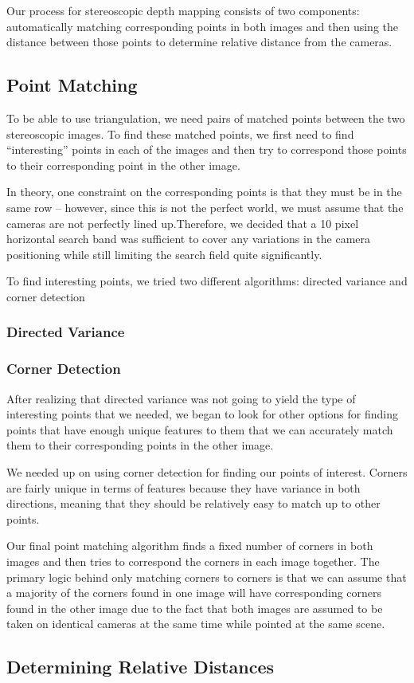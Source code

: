 Our process for stereoscopic depth mapping consists of two components: automatically matching corresponding points in both images and then using the distance between those points to determine relative distance from the cameras. 

\subsection{Point Matching}
To be able to use triangulation, we need pairs of matched points between the two stereoscopic images. To find these matched points, we first need to find ``interesting'' points in each of the images and then try to correspond those points to their corresponding point in the other image. 

In theory, one constraint on the corresponding points is that they must be in the same row -- however, since this is not the perfect world, we must assume that the cameras are not perfectly lined up.Therefore, we decided that a 10 pixel horizontal search band was sufficient to cover any variations in the camera positioning while still limiting the search field quite significantly. 

To find interesting points, we tried two different algorithms: directed variance and corner detection

\subsubsection{Directed Variance}

\subsubsection{Corner Detection}
After realizing that directed variance was not going to yield the type of interesting points that we needed, we began to look for other options for finding points that have enough unique features to them that we can accurately match them to their corresponding points in the other image. 

We needed up on using corner detection for finding our points of interest. Corners are fairly unique in terms of features because they have variance in both directions, meaning that they should be relatively easy to match up to other points. 

Our final point matching algorithm finds a fixed number of corners in both images and then tries to correspond the corners in each image together. The primary logic behind only matching corners to corners is that we can assume that a majority of the corners found in one image will have corresponding corners found in the other image due to the fact that both images are assumed to be taken on identical cameras at the same time while pointed at the same scene.

\subsection{Determining Relative Distances}